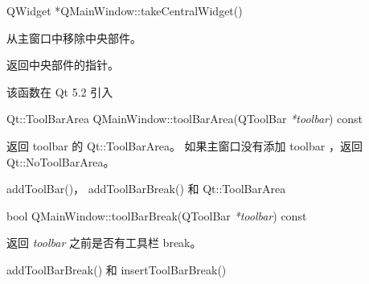 QWidget *QMainWindow::takeCentralWidget()

从主窗口中移除中央部件。

返回中央部件的指针。

该函数在 Qt 5.2 引入

\splitLine

Qt::ToolBarArea QMainWindow::toolBarArea(QToolBar \emph{*toolbar}) const

返回 toolbar 的 Qt::ToolBarArea。
 如果主窗口没有添加 toolbar ，返回 Qt::NoToolBarArea。

\begin{seeAlso}
addToolBar()， addToolBarBreak() 和 Qt::ToolBarArea
\end{seeAlso}

\splitLine

bool QMainWindow::toolBarBreak(QToolBar \emph{*toolbar}) const

返回 \emph{toolbar} 之前是否有工具栏 break。

\begin{seeAlso}
addToolBarBreak() 和 insertToolBarBreak()
    \end{seeAlso}